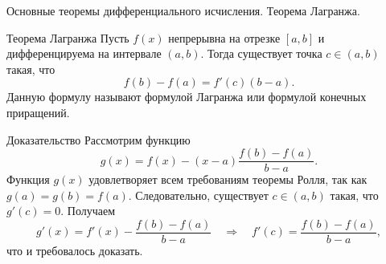 \documentclass[8pt]{beamer}
\begin{document}
\begin{frame}{Основные теоремы дифференциального исчисления. Теорема Лагранжа.}
\begin{block}{Теорема Лагранжа}
Пусть $f(x)$ непрерывна на отрезке $[a,b]$ и дифференцируема на интервале $(a,b)$. Тогда существует точка $c\in(a,b)$ такая, что
$$f(b)-f(a) = f'(c)(b-a).$$
Данную формулу называют формулой Лагранжа или формулой конечных приращений.
\end{block} 
\begin{block}{Доказательство}
Рассмотрим функцию 
$$g(x)=f(x)-(x-a)\frac{f(b)-f(a)}{b-a}.$$
Функция $g(x)$ удовлетворяет всем требованиям теоремы Ролля, так как $g(a)=g(b)=f(a)$. Следовательно, существует $c\in(a,b)$ такая, что $g'(c)=0$. Получаем
$$g'(x) = f'(x) - \frac{f(b)-f(a)}{b-a}\quad \Rightarrow \quad f'(c) = \frac{f(b)-f(a)}{b-a},$$
что и требовалось доказать.
\end{block}
\end{frame}
\end{document}

